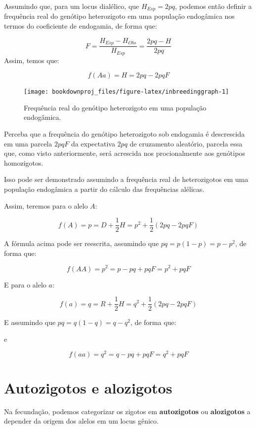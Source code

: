 \documentclass[
]{book}
\begin{document}
Assumindo que, para um locus dialélico, que \(H_{Esp} = 2pq\), podemos então definir a frequência real do genótipo heterozigoto em uma população endogâmica nos termos do coeficiente de endogamia, de forma que:

\[F = \frac {H_{Esp} - H_{Obs}}{H_{Esp}} = \frac {2pq - H}{2pq}\]
Assim, temos que:

\[f(Aa) = H = 2pq - 2pqF\]

\begin{figure}

{\centering \texttt{[image: bookdownproj\_files/figure-latex/inbreedinggraph-1]} 

}

\caption{Frequência real do genótipo heterozigoto em uma população endogâmica.}\label{fig:inbreedinggraph}
\end{figure}

Perceba que a frequência do genótipo heterozigoto sob endogamia é descrescida em uma parcela \(2pqF\) da expectativa \(2pq\) de cruzamento aleatório, parcela essa que, como visto anteriormente, será acrescida nos procionalmente aos genótipos homozigotos.

Isso pode ser demonstrado assumindo a frequência real de heterozigotos em uma população endogâmica a partir do cálculo das frequências alélicas.

Assim, teremos para o alelo \(A\):

\[ f(A) = p = D + \frac{1}{2}H = p^2 + \frac{1}{2}(2pq - 2pqF)\]

A fórmula acima pode ser reescrita, assumindo que \(pq=p(1-p)=p-p^2\), de forma que:

\[f(AA) = p^2 = p - pq + pqF = p^2 +pqF\]

E para o alelo \(a\):

\[ f(a) = q = R + \frac{1}{2}H = q^2 + \frac{1}{2}(2pq - 2pqF)\]

E assumindo que \(pq=q(1-q)=q-q^2\), de forma que:

e

\[f(aa) = q^2 = q - pq + pqF = q^2 +pqF\]

\hypertarget{autozigotos-e-alozigotos}{%
\section{Autozigotos e alozigotos}\label{autozigotos-e-alozigotos}}

Na fecundação, podemos categorizar os zigotos em \textbf{autozigotos} ou \textbf{alozigotos} a depender da origem dos alelos em um locus gênico.
\end{document}
